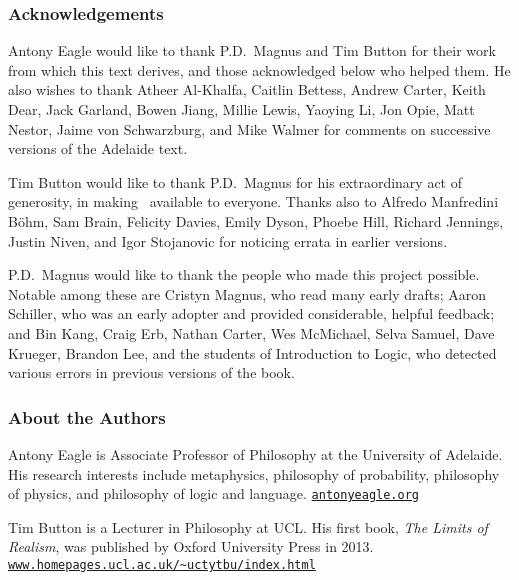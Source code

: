 \thispagestyle{empty}
\onecolumn



\subsubsection*{Acknowledgements}
Antony Eagle would like to thank P.D.\ Magnus and Tim Button for their work from which this text derives, and those acknowledged below who helped them. He also wishes to thank Atheer Al-Khalfa, Caitlin Bettess, Andrew Carter, Keith Dear, Jack Garland, Bowen Jiang, Millie Lewis, Yaoying Li, Jon Opie, Matt Nestor, Jaime von Schwarzburg, and Mike Walmer for comments on successive versions of the Adelaide text.  \medskip

Tim Button would like to thank P.D.\ Magnus for his extraordinary act of generosity, in making \forallx\ available to everyone. Thanks also to Alfredo Manfredini Böhm, Sam Brain, Felicity Davies, Emily Dyson, Phoebe Hill, Richard Jennings, Justin Niven,  and Igor Stojanovic for noticing errata in earlier versions. \medskip

P.D.\ Magnus would like to thank the people who made this project possible. Notable among these are Cristyn Magnus, who read many early drafts; Aaron Schiller, who was an early adopter and provided considerable, helpful feedback; {and} Bin Kang, Craig Erb, Nathan Carter, Wes McMichael, Selva Samuel,  Dave Krueger, Brandon Lee, and the students of Introduction to Logic, who detected various errors in previous versions of the book. 

\subsubsection*{About the Authors}

Antony Eagle is Associate Professor of Philosophy at the University of Adelaide. His research interests include metaphysics, philosophy of probability, philosophy of physics, and philosophy of logic and language. \href{https://antonyeagle.org}{\nolinkurl{antonyeagle.org}}
\medskip


Tim Button is a Lecturer in Philosophy at UCL. His first book, \emph{The Limits of Realism}, was published by Oxford University Press in 2013. \href{http://www.homepages.ucl.ac.uk/~uctytbu/index.html}{\nolinkurl{www.homepages.ucl.ac.uk/~uctytbu/index.html}}
\medskip

